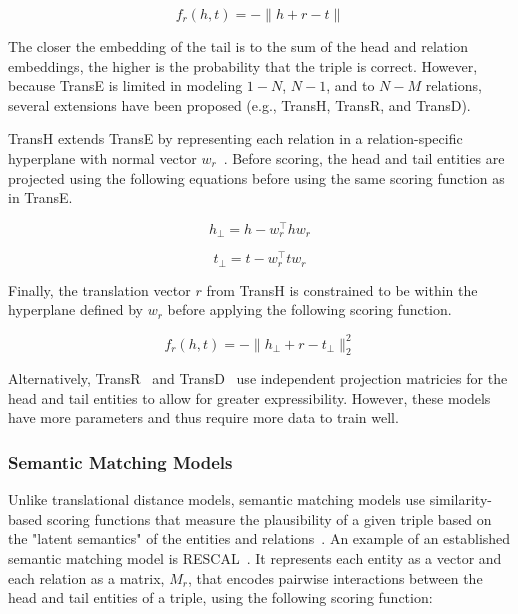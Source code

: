 \begin{equation}
    \label{eq:trans_e_scoring_function}
    f_r(h,t) = - \|h + r - t\|
\end{equation}

The closer the embedding of the tail is to the sum of the head and relation embeddings, the higher is the probability that the triple is correct.
However, because TransE is limited in modeling $1-N$, $N-1$, and to $N-M$ relations, several extensions have been proposed (e.g., TransH, TransR, and TransD).

TransH extends TransE by representing each relation in a relation-specific hyperplane with normal vector $w_r$~\cite{Wang2014}.
Before scoring, the head and tail entities are projected using the following equations before using the same scoring function as in TransE\@.

\begin{equation}
    \label{eq:trans_h_proj_head}
    h_{\perp} = h -w_{r}^\top hw_r
\end{equation}

\begin{equation}
    \label{eq:trans_h_proj_tail}
    t_{\perp} = t -w_{r}^\top tw_r
\end{equation}

Finally, the translation vector $r$ from TransH is constrained to be within the hyperplane defined by $w_r$ before applying the following scoring function.

\begin{equation}
    \label{eq:trans_h_scoring_function}
    f_r(h,t) = -\|h_{\perp} + r - t_{\perp}\|_{2}^2
\end{equation}

Alternatively, TransR~\cite{Lin2015} and TransD~\cite{Ji2015} use independent projection matricies for the head and tail entities to allow for greater expressibility.
However, these models have more parameters and thus require more data to train well.

\subsubsection{Semantic Matching Models}

Unlike translational distance models, semantic matching models use similarity-based scoring functions that measure the plausibility of a given triple based on the "latent semantics" of the entities and relations~\cite{Wang2017}.
An example of an established semantic matching model is RESCAL~\cite{Nickel2011}.
It represents each entity as a vector and each relation as a matrix, $M_r$, that encodes pairwise interactions between the head and tail entities of a triple, using the following scoring function:

